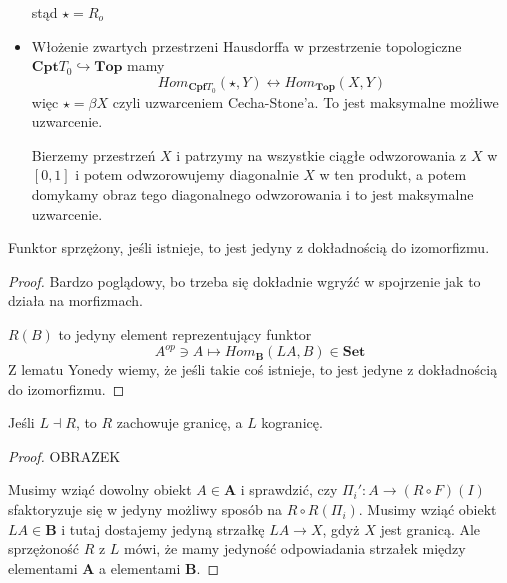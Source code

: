 \begin{example}
\begin{itemize}
      \begin{center}\end{center}
  
      stąd $\star=R_o$
    \item Włożenie zwartych przestrzeni Hausdorffa w przestrzenie topologiczne $\mathbf{Cpt}T_0\hookrightarrow \mathbf{Top}$ mamy
      $$Hom_{\mathbf{Cpf}T_0}(\star, Y)\longleftrightarrow Hom_{\mathbf{Top}}(X,Y)$$
      więc $\star=\beta X$ czyli uzwarceniem Cecha-Stone'a. To jest maksymalne możliwe uzwarcenie. 
  
      Bierzemy przestrzeń $X$ i patrzymy na wszystkie ciągłe odwzorowania z $X$ w $[0,1]$ i potem odwzorowujemy diagonalnie $X$ w ten produkt, a potem domykamy obraz tego diagonalnego odwzorowania i to jest maksymalne uzwarcenie.
  \end{itemize}
\end{example}

\begin{fact}
  Funktor sprzężony, jeśli istnieje, to jest jedyny z dokładnością do izomorfizmu.
\end{fact}

\begin{proof}
  Bardzo poglądowy, bo trzeba się dokładnie wgryźć w spojrzenie jak to działa na morfizmach.

  $R(B)$ to jedyny element reprezentujący funktor
  $$A^{op}\ni A\mapsto Hom_{\mathbf{B}}(LA,B)\in\mathbf{Set}$$
    Z lematu Yonedy wiemy, że jeśli takie coś istnieje, to jest jedyne z dokładnością do izomorfizmu.
\end{proof}

\begin{fact}
  Jeśli $L\dashv R$, to $R$ zachowuje granicę, a $L$ kogranicę.
\end{fact}

\begin{proof}
  {\large\color{red}OBRAZEK}

  Musimy wziąć dowolny obiekt $A\in \mathbf{A}$ i sprawdzić, czy $\Pi_i':A\to (R\circ F)(I)$ sfaktoryzuje się w jedyny możliwy sposób na $R\circ R(\Pi_i)$. Musimy wziąć obiekt $LA\in\mathbf{B}$ i tutaj dostajemy jedyną strzałkę $LA\to X$, gdyż $X$ jest granicą. Ale sprzężoność $R$ z $L$ mówi, że mamy jedyność odpowiadania strzałek między elementami $\mathbf{A}$ a elementami $\mathbf{B}$.
\end{proof}

